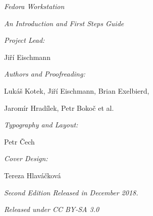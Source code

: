 \newpage\mbox{}\newpage
\begin{center}

\emph{\large Fedora Workstation}

\emph{\large An Introduction and First Steps Guide}

\bigskip

\emph{Project Lead:}

Jiří Eischmann

\medskip

\emph{Authors and Proofreading:}

Lukáš Kotek, Jiří Eischmann, Brian Exelbierd,

Jaromír Hradílek, Petr Bokoč et al.

\medskip

\emph{Typography and Layout:}

Petr Čech

\medskip

\emph{Cover Design:}

Tereza Hlaváčková

\medskip

\emph{Second Edition Released in December 2018.}

\emph{Released under CC BY-SA 3.0}
\end{center}
